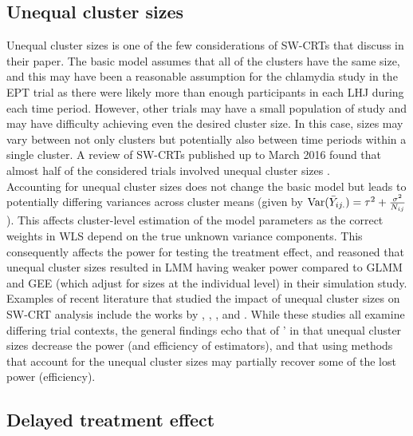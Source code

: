 \documentclass[10pt]{article}
\begin{document}
\subsection{Unequal cluster sizes}

Unequal cluster sizes is one of the few considerations of SW-CRTs that \citeauthor{Hussey:2007} discuss in their paper. The basic model assumes that all of the clusters have the same size, and this may have been a reasonable assumption for the chlamydia study in the EPT trial as there were likely more than enough participants in each LHJ during each time period. However, other trials may have a small population of study and may have difficulty achieving even the desired cluster size. In this case, sizes may vary between not only clusters but potentially also between time periods within a single cluster. A review of SW-CRTs published up to March 2016 found that almost half of the considered trials involved unequal cluster sizes \parencite{Kristunas:2017}.
\\

Accounting for unequal cluster sizes does not change the basic model but leads to potentially differing variances across cluster means (given by $\mathrm{Var}(\bar{Y}_{ij.})=\tau^2+\frac{\sigma^2}{N_{ij}}$). This affects cluster-level estimation of the model parameters as the correct weights in WLS depend on the true unknown variance components. This consequently affects the power for testing the treatment effect, and \textcite{Hussey:2007} reasoned that unequal cluster sizes resulted in LMM having weaker power compared to GLMM and GEE (which adjust for sizes at the individual level) in their simulation study.
\\

Examples of recent literature that studied the impact of unequal cluster sizes on SW-CRT analysis include the works by \textcite{Martin:2019}, \textcite{Ouyang:2020}, \textcite{Kasza:2021}, and \textcite{Tian:2021}. While these studies all examine differing trial contexts, the general findings echo that of \citeauthor{Hussey:2007}' in that unequal cluster sizes decrease the power (and efficiency of estimators), and that using methods that account for the unequal cluster sizes may partially recover some of the lost power (efficiency).

\subsection{Delayed treatment effect}
\end{document}
